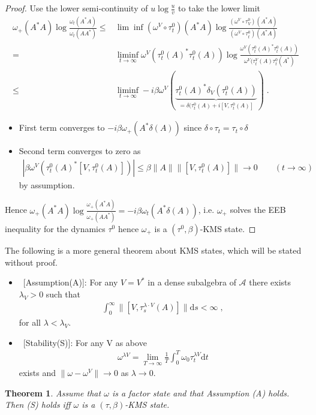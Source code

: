 \documentclass[
a4paper, %
11pt, %
onecolumn, %
openany, %
]{memoir}
\theoremstyle{definition}
\theoremstyle{remark}
\theoremstyle{plain}
\newtheorem{theorem}[definition]{Theorem}
\begin{document}
\begin{proof}
 Use the lower semi-continuity  of $u\log\frac{u}{v}$ to take the lower limit \begin{align}
 \omega_+(A^*A)\log\frac{\omega_t(A^*A)}{\omega_t(AA^*)}\leq& \lim\inf (\omega^V\circ \tau_t^0)(A^*A)\log\frac{(\omega^V\circ\tau_V^0)(A^*A)}{(\omega^V\circ\tau_t^0)(A^*A)}\\
 =& \liminf\limits_{t\rightarrow\infty} \omega^V(\tau_t^0(A)^*\tau_t^0(A))\log\frac{\omega^V(\tau_t^0(A)^*\tau_t^0(A))}{\omega^V(\tau_t^V(A)\tau_t^0(A^*)}\\
 \leq& \liminf\limits_{t\rightarrow\infty} -i\beta \omega^V(\underbrace{\tau_t^0(A)^*\delta_V(\tau_t^0(A))}_{=\delta(\tau_t^0(A)+i[V,\tau_t^0(A)]})\; .
 \end{align}
\begin{itemize}
\item First term converges to $-i\beta\omega_+(A^*\delta(A))$ since $\delta\circ\tau_t=\tau_t\circ \delta$
\item Second term converges to zero as \begin{align}
|\beta\omega^V(\tau_t^0(A)^*[V,\tau_t^0(A)])|\leq \beta \|A\| \|[V,\tau_t^0(A)]\| \rightarrow 0 \qquad (t\rightarrow \infty)
\end{align}
by assumption.
\end{itemize}
Hence $\omega_+(A^*A)\log\frac{\omega_+(A^*A)}{\omega_+(AA^*)}=-i\beta\omega_t(A^*\delta(A))$, i.e. $\omega_+$ solves the EEB inequality for the dynamics $\tau^0$ hence $\omega_+$ is a $(\tau^0,\beta)$-KMS state.
\end{proof}
The following is a more general theorem about KMS states, which will be stated without proof.
\begin{itemize}
\item ~[Assumption(A)]: For any $V=V^*$ in a dense subalgebra of $\mathcal{A}$ there exists $\lambda_V>0$ such that \begin{align}
\int_0^{\infty}\|[V,\tau_s^{\lambda\cdot V}(A)]\|\mathrm{d}s< \infty\;, 
\end{align}
for all $\lambda<\lambda_V$.
\item ~[Stability(S)]: For any V as above \begin{align}
\omega^{\lambda V}=\lim_{T\rightarrow\infty}\frac{1}{T}\int_0^T\omega_0\tau_t^{\lambda V}\mathrm{d}t
\end{align}
exists and $\|\omega-\omega^V\|\rightarrow 0$ as $\lambda\rightarrow 0$.
\end{itemize}
\begin{theorem}
Assume that $\omega$ is a factor state and that Assumption (A) holds. Then (S) holds iff $\omega$ is a $(\tau,\beta)$-KMS state.
\end{theorem}
\end{document}
